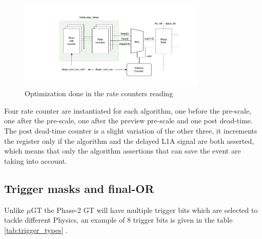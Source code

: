 \documentclass[../../main.tex]{subfiles}
\begin{document}
\begin{figure}[h]
    \centering
    \includegraphics[width=0.8\textwidth]{sections/06/Images/Rate_regs.pdf}
    \caption{Optimization done in the rate counters reading}
    \label{fig:Rate_cnt}
\end{figure}

Four rate counter are instantiated for each algorithm, one before the pre-scale, one after the pre-scale, one after the preview pre-scale and one post dead-time. The post dead-time counter is a slight variation of the other three, it increments the register only if the algorithm and the delayed L1A signal are both asserted,  which means that only the algorithm assertions that can save the event are taking into account.

\subsection{Trigger masks and final-OR}
\label{sec:Finor_trigger}

Unlike $\mu$GT the Phase-2 GT will have multiple trigger bits which are selected to tackle different Physics, an example of 8 trigger bits is given in the table \ref{tab:trigger_types} \cite{L1T-2up}.  
\end{document}
